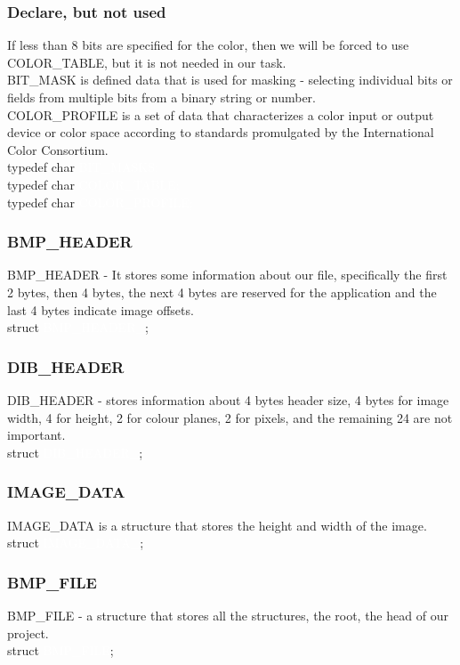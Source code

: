 \documentclass{article}
\begin{document}
\subsubsection{Declare, but not used}

If less than 8 bits are specified for the color, then we will be forced to use COLOR\_TABLE, but it is not needed in our task.
\\
BIT\_MASK is defined data that is used for masking - selecting individual bits or fields from multiple bits from a binary string or number.
\\
COLOR\_PROFILE is a set of data that characterizes a color input or output device or color space according to standards promulgated by the International Color Consortium.
\\[1\baselineskip]
\colorbox{black!80}{\textcolor{orange!65}{typedef char} \textcolor{white}{BIT\_MASKS\textcolor{orange!65}{;}}}
\\
\colorbox{black!80}{\textcolor{orange!65}{typedef char} \textcolor{white}{COLOR\_TABLE\textcolor{orange!65}{;}}}
\\
\colorbox{black!80}{\textcolor{orange!65}{typedef char} \textcolor{white}{COLOR\_PROFILE\textcolor{orange!65}{;}}}
\\[1\baselineskip]

\subsubsection{BMP\_HEADER}
BMP\_HEADER - It stores some information about our file, specifically the first 2 bytes, then 4 bytes, the next 4 bytes are reserved for the application and the last 4 bytes indicate image offsets.
\\[1\baselineskip]
\colorbox{black!80}{\textcolor{orange!65}{struct} \textcolor{white}{BMP\_HEADER\_}\textcolor{orange!65}{;}}
\subsubsection{DIB\_HEADER}
DIB\_HEADER - stores information about 4 bytes header size, 4 bytes for image width, 4 for height, 2 for colour planes, 2 for pixels, and the remaining 24 are not important.
\\[1\baselineskip]
\colorbox{black!80}{\textcolor{orange!65}{struct} \textcolor{white}{DIB\_HEADER\_}\textcolor{orange!65}{;}}
\subsubsection{IMAGE\_DATA}
IMAGE\_DATA is a structure that stores the height and width of the image.
\\[1\baselineskip]
\colorbox{black!80}{\textcolor{orange!65}{struct} \textcolor{white}{IMAGE\_DATA\_}\textcolor{orange!65}{;}}
\subsubsection{BMP\_FILE}
BMP\_FILE - a structure that stores all the structures, the root, the head of our project.
\\[1\baselineskip]
\colorbox{black!80}{\textcolor{orange!65}{struct} \textcolor{white}{BMP\_FILE}\textcolor{orange!65}{;}}
\end{document}
